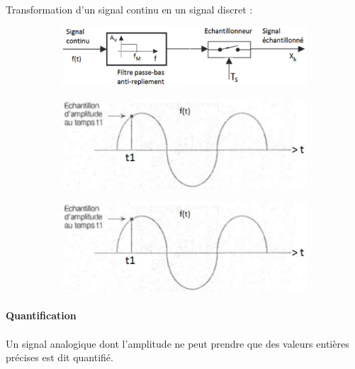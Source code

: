 \documentclass{article}
\begin{document}
\paragraph{}
Transformation d'un signal continu en un signal discret :
\begin{figure}[H]
    \centering
    \begin{subfigure}{\textwidth}
        \centering
        \includegraphics[width=0.8\linewidth]{./images/CAN1.png}
    \end{subfigure}
    \begin{subfigure}{.4\textwidth}
        \centering
        \includegraphics[width=\linewidth]{./images/CAN2.png}
    \end{subfigure}
    \begin{subfigure}{.4\textwidth}
        \centering
        \includegraphics[width=\linewidth]{./images/CAN2.png}
    \end{subfigure}
\end{figure}

\paragraph{Quantification}
\paragraph{}
Un signal analogique dont l'amplitude ne peut prendre que des valeurs entières précises est dit quantifié.
\end{document}
